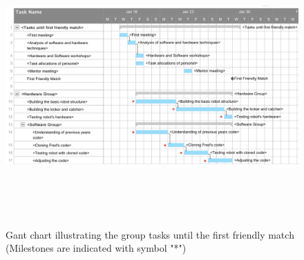 \documentclass{article}
\begin{document}
\begin{figure}[H]
	\centering
	\begin{minipage}{1\textwidth}
		\centering
		\includegraphics[width=16cm, height=10cm]{FirstFriendlyMatch.png}\\
		\caption{Gant chart illustrating the group tasks until the first friendly match (Milestones are indicated with symbol "*")}
	\end{minipage}%
\end{figure}
\end{document}
